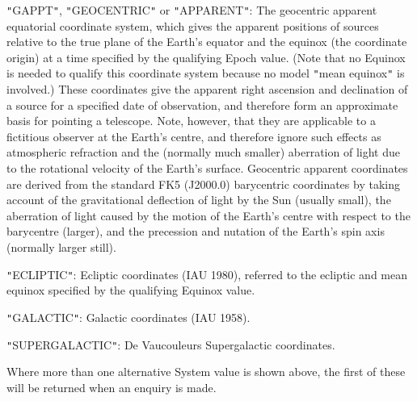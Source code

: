 \documentclass[twoside,11pt]{article}
\begin{document}
{{{         \sstitem
         {\tt{"}}GAPPT{\tt{"}}, {\tt{"}}GEOCENTRIC{\tt{"}} or {\tt{"}}APPARENT{\tt{"}}: The geocentric apparent
         equatorial coordinate system, which gives the apparent positions
         of sources relative to the true plane of the Earth's equator and
         the equinox (the coordinate origin) at a time specified by the
         qualifying Epoch value. (Note that no Equinox is needed to
         qualify this coordinate system because no model {\tt{"}}mean equinox{\tt{"}}
         is involved.)  These coordinates give the apparent right
         ascension and declination of a source for a specified date of
         observation, and therefore form an approximate basis for
         pointing a telescope. Note, however, that they are applicable to
         a fictitious observer at the Earth's centre, and therefore
         ignore such effects as atmospheric refraction and the (normally
         much smaller) aberration of light due to the rotational velocity
         of the Earth's surface.  Geocentric apparent coordinates are
         derived from the standard FK5 (J2000.0) barycentric coordinates
         by taking account of the gravitational deflection of light by
         the Sun (usually small), the aberration of light caused by the
         motion of the Earth's centre with respect to the barycentre
         (larger), and the precession and nutation of the Earth's spin
         axis (normally larger still).

         \sstitem
         {\tt{"}}ECLIPTIC{\tt{"}}: Ecliptic coordinates (IAU 1980), referred to the
         ecliptic and mean equinox specified by the qualifying Equinox
         value.

         \sstitem
         {\tt{"}}GALACTIC{\tt{"}}: Galactic coordinates (IAU 1958).

         \sstitem
         {\tt{"}}SUPERGALACTIC{\tt{"}}: De Vaucouleurs Supergalactic coordinates.

      }
      Where more than one alternative System value is shown above, the
      first of these will be returned when an enquiry is made.
   }
}
\end{document}
